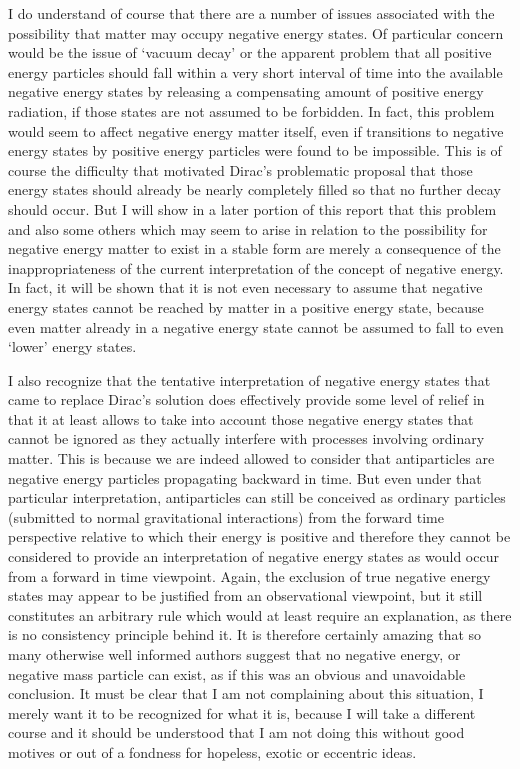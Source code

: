 \documentclass[notitlepage,12pt]{report}
\begin{document}
I do understand of course that there are a number of issues associated with the possibility that matter may occupy negative energy states. Of particular concern would be the issue of `vacuum decay' or the apparent problem that all positive energy particles should fall within a very short interval of time into the available negative energy states by releasing a compensating amount of positive energy radiation, if those states are not assumed to be forbidden. In fact, this problem would seem to affect negative energy matter itself, even if transitions to negative energy states by positive energy particles were found to be impossible. This is of course the difficulty that motivated Dirac's problematic proposal that those energy states should already be nearly completely filled so that no further decay should occur. But I will show in a later portion of this report that this problem and also some others which may seem to arise in relation to the possibility for negative energy matter to exist in a stable form are merely a consequence of the inappropriateness of the current interpretation of the concept of negative energy. In fact, it will be shown that it is not even necessary to assume that negative energy states cannot be reached by matter in a positive energy state, because even matter already in a negative energy state cannot be assumed to fall to even `lower' energy states.

I also recognize that the tentative interpretation of negative energy states that came to replace Dirac's solution does effectively provide some level of relief in that it at least allows to take into account those negative energy states that cannot be ignored as they actually interfere with processes involving ordinary matter. This is because we are indeed allowed to consider that antiparticles are negative energy particles propagating backward in time. But even under that particular interpretation, antiparticles can still be conceived as ordinary particles (submitted to normal gravitational interactions) from the forward time perspective relative to which their energy is positive and therefore they cannot be considered to provide an interpretation of negative energy states as would occur from a forward in time viewpoint. Again, the exclusion of true negative energy states may appear to be justified from an observational viewpoint, but it still constitutes an arbitrary rule which would at least require an explanation, as there is no consistency principle behind it. It is therefore certainly amazing that so many otherwise well informed authors suggest that no negative energy, or negative mass particle can exist, as if this was an obvious and unavoidable conclusion. It must be clear that I am not complaining about this situation, I merely want it to be recognized for what it is, because I will take a different course and it should be understood that I am not doing this without good motives or out of a fondness for hopeless, exotic or eccentric ideas.
\end{document}
